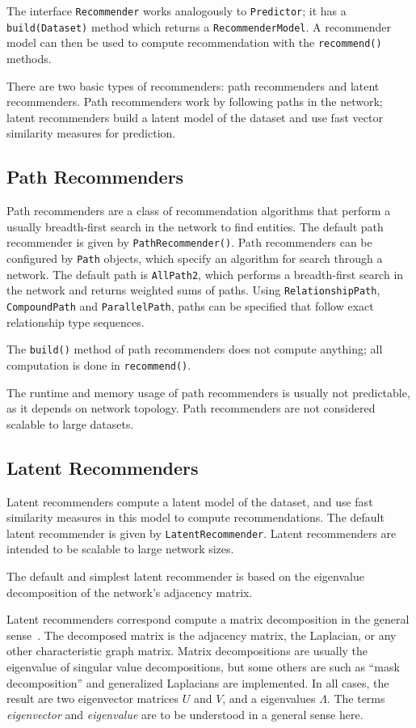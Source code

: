 \documentclass{article}
\begin{document}
The interface \texttt{Recommender} works analogously to
\texttt{Predictor}; it has a \texttt{build(Dataset)} method which
returns a \texttt{RecommenderModel}.  A recommender model can then be
used to compute recommendation with the \texttt{recommend()} methods.

There are two basic types of recommenders:  path recommenders and latent
recommenders.  Path recommenders work by following paths in the network;
latent recommenders build a latent model of the dataset and use fast
vector similarity measures for prediction. 

\subsection{Path Recommenders}
Path recommenders are a class of recommendation algorithms that perform
a usually breadth-first search in the network to find entities.  The
default path recommender is given by \texttt{PathRecommender()}.  Path
recommenders can be configured by \texttt{Path} objects, which specify
an algorithm for search through a network.  The default path is
\texttt{AllPath2}, which performs a breadth-first search in the network
and returns weighted sums of paths.  Using \texttt{RelationshipPath},
\texttt{CompoundPath} and \texttt{ParallelPath}, paths can be specified
that follow exact relationship type sequences.

The \texttt{build()} method of path recommenders does not compute
anything; all computation is done in \texttt{recommend()}. 

The runtime and memory usage of path recommenders is usually not
predictable, as it depends on network topology.  Path recommenders are
not considered scalable to large datasets.  

\subsection{Latent Recommenders}
Latent recommenders compute a latent model of the dataset, and use fast
similarity measures in this model to compute recommendations.  The
default latent recommender is given by \texttt{LatentRecommender}. 
Latent recommenders are intended to be scalable to large network sizes. 

The default and simplest latent recommender is based on the eigenvalue
decomposition of the network's adjacency matrix. 

Latent recommenders correspond compute a matrix decomposition in the
general sense~\cite{kunegis:spectral-transformation}.  The decomposed
matrix is the adjacency matrix, the 
Laplacian, or any other characteristic graph matrix. 
Matrix decompositions are usually the eigenvalue of singular value
decompositions, but some others are such as ``mask decomposition'' and
generalized Laplacians are implemented.  
In all cases, the result are two eigenvector matrices $U$ and $V$, and a
eigenvalues $\Lambda$.  The terms \emph{eigenvector} and
\emph{eigenvalue} are to be understood in a general sense here. 
\end{document}
